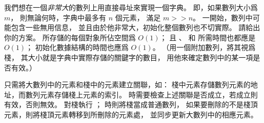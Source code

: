 \startEXERCISE\DIFFICULT
我們想在一個\emph{非常大}的數列上用直接尋址來實現一個字典。
即，如果數列大小爲 $m$，
則無論何時，字典中最多有 $n$ 個元素，
滿足 $m>>n$。
一開始，數列中可能包含一些無用信息，
並且由於他非常大，初始化整個數列也不切實際。
請給出你的方案。
所存儲的每個對象所佔空間爲 $O(1)$；
且 、 
 和  所需時間也都應是 $O(1)$；
初始化數據結構的時間也應爲 $O(1)$。
（\hint 用一個附加數列，將其視爲棧，
其大小就是字典中實際存儲的關鍵字的數目，
用他來確定數列中的某一項是否有效。）
\stopEXERCISE

\startANSWER
只需將大數列中的元素和棧中的元素建立關聯，如：
棧中元素存儲數列元素的地址，而數列元素存儲棧上元素的索引。
  時需要檢查上述關聯是否成立，若成立則有效，否則無效。
  對棧執行 ；
  時則將棧當成普通數列，
如果要刪除的不是棧頂元素，則將棧頂元素轉移到所刪除的元素處，
並同步更新大數列中的相應元素。
\stopANSWER
